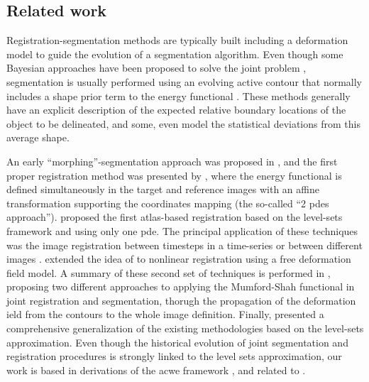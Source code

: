 \subsection{Related work}
\label{sec:methods_background}
Registration-segmentation methods are typically built including a deformation
  model to guide the evolution of a segmentation algorithm.
Even though some Bayesian approaches have been proposed to solve the joint problem
  \citep{wyatt_map_2003}, segmentation is usually performed using an evolving
  active contour \citep{chan_active_2001} that normally includes a shape prior
  term to the energy functional \citep{chen_using_2002,bresson_variational_2006,
  chan_level_2005,cremers_kernel_2006,gastaud_combining_2004}.
These methods generally have an explicit description of the expected relative boundary
  locations of the object to be delineated, and some, even model the statistical deviations
  from this average shape.


An early ``morphing''-segmentation approach was proposed in \citep{bertalmio_morphing_2000},
  and the first proper registration method was presented by \citeauthor{yezzi_variational_2001}
  \citep{yezzi_variational_2001}, where the energy functional is defined simultaneously in the target
  and reference images with an affine transformation supporting the coordinates mapping
  (the so-called ``2 \glspl*{pde} approach'').
\citeauthor{vemuri_joint_2003} proposed the first atlas-based registration \citep{vemuri_joint_2003}
  based on the level-sets framework and using only one \gls*{pde}.
The principal application of these techniques was the image registration between timesteps in
  a time-series or between different images \citep{paragios_level_2003}.
\citeauthor{unal_coupled_2005} \citep{unal_coupled_2005} extended the idea of
  \citep{bertalmio_morphing_2000,yezzi_variational_2001} to nonlinear registration
  using a free deformation field model.
A summary of these second set of techniques is performed in \citep{droske_mumfordshah_2009},
  proposing two different approaches to applying the Mumford-Shah \citep{mumford_optimal_1989}
  functional in joint registration and segmentation, thorugh the propagation of the deformation
  ield from the contours to the whole image definition.
Finally, \citeauthor{gorthi_active_2011} presented a comprehensive generalization of the
  existing methodologies \citep{gorthi_active_2011} based on the level-sets approximation.
Even though the historical evolution of joint segmentation and registration procedures is strongly
  linked to the level sets approximation, our work is based in derivations of the \gls{acwe}
  framework \citep{chan_active_2001}, and related to \citep{guyader_combined_2011}.


